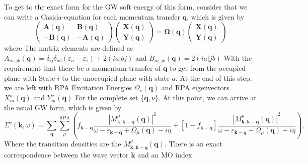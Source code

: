 To get to the exact form for the GW soft energy of this form, consider that we can write a Casida-equation for each momentum transfer $\mathbf{q}$, which is given by
\begin{equation}
\begin{pmatrix}
\bm{A}(\mathbf{q}) & \bm{B}(\mathbf{q}) \\
-\bm{B}(\mathbf{q}) & -\bm{A}(\mathbf{q})
\end{pmatrix}
\begin{pmatrix}
\bm{X}(\mathbf{q})\\
\bm{Y}(\mathbf{q})
\end{pmatrix}
= \bm{\Omega}(\mathbf{q})
\begin{pmatrix}
\bm{X}(\mathbf{q})\\
\bm{Y}(\mathbf{q})
\end{pmatrix}
\end{equation}
where The matrix elements are defined as $A_{ia,jb}(\mathbf{q}) = \delta_{ij} \delta_{ab} (\varepsilon_a - \varepsilon_i) + 2 (ia|bj)$ and $B_{ia,jb}(\mathbf{q}) = 2 (ia|jb)$ With the requirement that there be a momentum transfer of $\mathbf{q}$ to get from the occupied plane with State $i$ to the unoccupied plane with state $a$. At the end of this step, we are left with RPA Excitation Energies $\Omega_\nu(\mathbf{q})$ and RPA eigenvectors $X_{ia}^\nu(\mathbf{q})$ and $Y_{ia}^\nu(\mathbf{q})$ For the complete set $\{{\mathbf{q}, \nu}\}$. At this point, we can arrive at the usual GW form, which is given by
\begin{equation}
\Sigma^c(\mathbf{k}, \omega)=\sum_{\mathbf{q}} \sum_\mu^{\mathrm{RPA}}\left(f_{\mathbf{k}-\mathbf{q}} \frac{\left|M_{\mathbf{k}, \mathbf{k}-\mathbf{q}}^\mu(\mathbf{q})\right|^2}{\omega-\varepsilon_{\mathbf{k}-\mathbf{q}}+\Omega_\mu(\mathbf{q})-i \eta}+\left[1-f_{\mathbf{k}-\mathbf{q}}\right] \frac{\left|M_{\mathbf{k}, \mathbf{k}-\mathbf{q}}^\mu(\mathbf{q})\right|^2}{\omega-\varepsilon_{\mathbf{k}-\mathbf{q}}-\Omega_\mu(\mathbf{q})+i \eta}\right),
\end{equation}
Where the transition densities are the $M_{\mathbf{k}, \mathbf{k}-\mathbf{q}}^\mu(\mathbf{q})$. There is an exact correspondence between the wave vector $\mathbf{k}$ and an MO index.
